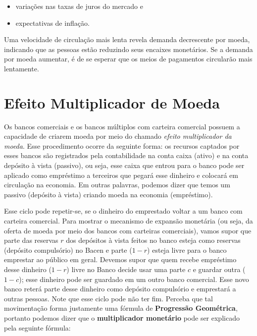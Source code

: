 \documentclass{article}\usepackage[]{graphicx}\usepackage[]{xcolor}
\begin{document}
\begin{itemize}

\item variações nas taxas de juros do mercado e

\item expectativas de inflação.

\end{itemize}

Uma velocidade de circulação mais lenta revela demanda decrescente por moeda, indicando que as pessoas 
estão reduzindo seus encaixes monetários. Se a demanda por moeda aumentar, é de se esperar que os meios 
de pagamentos circularão mais lentamente.\par

\section*{Efeito Multiplicador de Moeda}

Os bancos comerciais e os bancos múltiplos com carteira comercial possuem a capacidade de criarem moeda 
por meio do chamado \textit{efeito multiplicador da moeda}. Esse procedimento ocorre da seguinte forma: os 
recursos captados por esses bancos são registrados pela contabilidade na conta caixa (ativo) e na conta 
depósito à vista (passivo), ou seja, esse caixa que entrou para o banco pode ser aplicado como empréstimo 
a terceiros que pegará esse dinheiro e colocará em circulação na economia. Em outras palavras, podemos 
dizer que temos um passivo (depósito à vista) criando moeda na economia (empréstimo).\par

Esse ciclo pode repetir-se, se o dinheiro do emprestado voltar a um banco com carteira comercial. 
Para mostrar o mecanismo de expansão monetária (ou seja, da oferta de moeda por meio dos bancos com 
carteiras comerciais), vamos supor que parte das reservas \(r\) dos depósitos à vista feitos no banco esteja 
como reservas (depósito compulsório) no Bacen e parte (\(1-r\)) esteja livre para o banco emprestar ao público 
em geral. Devemos supor que quem recebe empréstimo desse dinheiro (\(1-r\)) livre no Banco decide usar uma 
parte \(c\) e guardar outra (\(1-c\)); esse dinheiro pode ser guardado em um outro banco comercial. Esse novo 
banco reterá parte desse dinheiro como depósito compulsório e emprestará a outras pessoas. Note que esse 
ciclo pode não ter fim. Perceba que tal movimentação forma justamente uma fórmula de \textbf{Progressão Geométrica}, 
portanto podemos dizer que o \textbf{multiplicador monetário} pode ser explicado pela seguinte fórmula:\par
\end{document}
